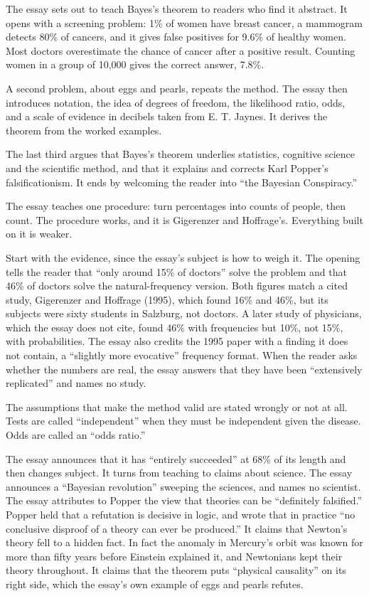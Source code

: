 \begin{afterword}
\summaryhead

The essay sets out to teach Bayes's theorem to readers who find it abstract. It opens with a screening problem: 1\% of women have breast cancer, a mammogram detects 80\% of cancers, and it gives false positives for 9.6\% of healthy women. Most doctors overestimate the chance of cancer after a positive result. Counting women in a group of 10,000 gives the correct answer, 7.8\%.

A second problem, about eggs and pearls, repeats the method. The essay then introduces notation, the idea of degrees of freedom, the likelihood ratio, odds, and a scale of evidence in decibels taken from E. T. Jaynes. It derives the theorem from the worked examples.

The last third argues that Bayes's theorem underlies statistics, cognitive science and the scientific method, and that it explains and corrects Karl Popper's falsificationism. It ends by welcoming the reader into ``the Bayesian Conspiracy.''

\responsehead

The essay teaches one procedure: turn percentages into counts of people, then count. The procedure works, and it is Gigerenzer and Hoffrage's. Everything built on it is weaker.

Start with the evidence, since the essay's subject is how to weigh it. The opening tells the reader that ``only around 15\% of doctors'' solve the problem and that 46\% of doctors solve the natural-frequency version. Both figures match a cited study, Gigerenzer and Hoffrage (1995), which found 16\% and 46\%, but its subjects were sixty students in Salzburg, not doctors. A later study of physicians, which the essay does not cite, found 46\% with frequencies but 10\%, not 15\%, with probabilities. The essay also credits the 1995 paper with a finding it does not contain, a ``slightly more evocative'' frequency format. When the reader asks whether the numbers are real, the essay answers that they have been ``extensively replicated'' and names no study.

The assumptions that make the method valid are stated wrongly or not at all. Tests are called ``independent'' when they must be independent given the disease. Odds are called an ``odds ratio.''

The essay announces that it has ``entirely succeeded'' at 68\% of its length and then changes subject. It turns from teaching to claims about science. The essay announces a ``Bayesian revolution'' sweeping the sciences, and names no scientist. The essay attributes to Popper the view that theories can be ``definitely falsified.'' Popper held that a refutation is decisive in logic, and wrote that in practice ``no conclusive disproof of a theory can ever be produced.'' It claims that Newton's theory fell to a hidden fact. In fact the anomaly in Mercury's orbit was known for more than fifty years before Einstein explained it, and Newtonians kept their theory throughout. It claims that the theorem puts ``physical causality'' on its right side, which the essay's own example of eggs and pearls refutes.


\end{afterword}

